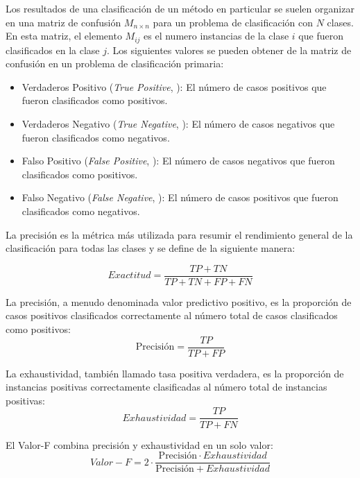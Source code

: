 Los resultados de una clasificación de un método en particular se suelen organizar en una matriz de confusión $M_{n \times n}$ para un problema de clasificación con $N$ clases.
En esta matriz, el elemento $M_{ij}$ es el numero instancias de la clase $i$ que fueron clasificados en la clase $j$.
Los siguientes valores se pueden obtener de la matriz de confusión en un problema de clasificación primaria:

\begin{itemize}
	\item Verdaderos Positivo (\emph{True Positive}, ): El número de casos positivos que fueron clasificados como positivos.
	\item Verdaderos Negativo (\emph{True Negative}, ): El número de casos negativos que fueron clasificados como negativos.
	\item Falso Positivo (\emph{False Positive}, ): El número de casos negativos que fueron clasificados como positivos.
	\item Falso Negativo (\emph{False Negative}, ): El número de casos positivos que fueron clasificados como negativos.
\end{itemize}

La precisión es la métrica más utilizada para resumir el rendimiento general de la clasificación para todas las clases y se define de la siguiente manera:

\begin{equation}
Exactitud = \frac{TP + TN}{TP + TN + FP + FN}\label{eq3:exactitud}
\end{equation}

La precisión, a menudo denominada valor predictivo positivo, es la proporción de casos positivos clasificados correctamente al número total de casos clasificados como positivos:
\begin{equation}
\mbox{Precisión} = \frac{TP}{TP + FP}\label{eq3:precision}
\end{equation}

La exhaustividad, también llamado tasa positiva verdadera, es la proporción de instancias positivas correctamente clasificadas al número total de instancias positivas:
\begin{equation}
Exhaustividad = \frac{TP}{TP + FN}\label{eq3:exaustividad}
\end{equation}


El Valor-F combina precisión y exhaustividad en un solo valor:
\begin{equation}
Valor-F = 2 \cdot \frac{\mbox{Precisión} \cdot Exhaustividad}{\mbox{Precisión} + Exhaustividad}\label{eq3:valorf}
\end{equation}

